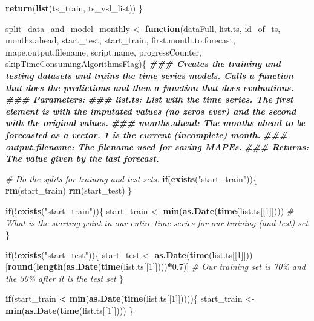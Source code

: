 \documentclass[
]{article}
\newenvironment{Shaded}{\begin{snugshade}}{\end{snugshade}}
\newcommand{\CommentTok}[1]{\textcolor[rgb]{0.56,0.35,0.01}{\textit{#1}}}
\newcommand{\ControlFlowTok}[1]{\textcolor[rgb]{0.13,0.29,0.53}{\textbf{#1}}}
\newcommand{\DecValTok}[1]{\textcolor[rgb]{0.00,0.00,0.81}{#1}}
\newcommand{\DocumentationTok}[1]{\textcolor[rgb]{0.56,0.35,0.01}{\textbf{\textit{#1}}}}
\newcommand{\FloatTok}[1]{\textcolor[rgb]{0.00,0.00,0.81}{#1}}
\newcommand{\FunctionTok}[1]{\textcolor[rgb]{0.13,0.29,0.53}{\textbf{#1}}}
\newcommand{\NormalTok}[1]{#1}
\newcommand{\OtherTok}[1]{\textcolor[rgb]{0.56,0.35,0.01}{#1}}
\newcommand{\SpecialCharTok}[1]{\textcolor[rgb]{0.81,0.36,0.00}{\textbf{#1}}}
\newcommand{\StringTok}[1]{\textcolor[rgb]{0.31,0.60,0.02}{#1}}
\begin{document}
\begin{Shaded}
\begin{Highlighting}[]
  \FunctionTok{return}\NormalTok{(}\FunctionTok{list}\NormalTok{(ts\_train, ts\_vsl\_list))}
\NormalTok{\}}


\NormalTok{split\_data\_and\_model\_monthly }\OtherTok{\textless{}{-}} \ControlFlowTok{function}\NormalTok{(dataFull, list.ts, id\_of\_ts, months.ahead, start\_test, start\_train, first.month.to.forecast, mape.output.filename, script.name, progressCounter, skipTimeConsumingAlgorithmsFlag)\{}
\DocumentationTok{\#\#\# Creates the training and testing datasets and trains the time series models. Calls a function that does the predictions and then a function that does evaluations.}
\DocumentationTok{\#\#\# Parameters:}
\DocumentationTok{\#\#\# list.ts: List with the time series. The first element is with the imputated values (no zeros ever) and the second with the original values.}
\DocumentationTok{\#\#\# months.ahead: The months ahead to be forecasted as a vector. 1 is the current (incomplete) month.}
\DocumentationTok{\#\#\# output.filename: The filename used for saving MAPEs.}
\DocumentationTok{\#\#\# Returns: The value given by the last forecast.}

  \CommentTok{\# Do the splits for training and test sets.}
  \ControlFlowTok{if}\NormalTok{(}\FunctionTok{exists}\NormalTok{(}\StringTok{"start\_train"}\NormalTok{))\{}
    \FunctionTok{rm}\NormalTok{(start\_train)}
    \FunctionTok{rm}\NormalTok{(start\_test)}
\NormalTok{  \}}

  \ControlFlowTok{if}\NormalTok{(}\SpecialCharTok{!}\FunctionTok{exists}\NormalTok{(}\StringTok{"start\_train"}\NormalTok{))\{}
\NormalTok{    start\_train }\OtherTok{\textless{}{-}} \FunctionTok{min}\NormalTok{(}\FunctionTok{as.Date}\NormalTok{(}\FunctionTok{time}\NormalTok{(list.ts[[}\DecValTok{1}\NormalTok{]]))) }\CommentTok{\# What is the starting point in our entire time series for our training (and test) set}
\NormalTok{  \}}

  \ControlFlowTok{if}\NormalTok{(}\SpecialCharTok{!}\FunctionTok{exists}\NormalTok{(}\StringTok{"start\_test"}\NormalTok{))\{}
\NormalTok{    start\_test }\OtherTok{\textless{}{-}} \FunctionTok{as.Date}\NormalTok{(}\FunctionTok{time}\NormalTok{(list.ts[[}\DecValTok{1}\NormalTok{]]))[}\FunctionTok{round}\NormalTok{(}\FunctionTok{length}\NormalTok{(}\FunctionTok{as.Date}\NormalTok{(}\FunctionTok{time}\NormalTok{(list.ts[[}\DecValTok{1}\NormalTok{]])))}\SpecialCharTok{*}\FloatTok{0.7}\NormalTok{)] }\CommentTok{\# Our training set is 70\% and the 30\% after it is the test set}
\NormalTok{  \}}
  
  \ControlFlowTok{if}\NormalTok{(start\_train }\SpecialCharTok{\textless{}} \FunctionTok{min}\NormalTok{(}\FunctionTok{as.Date}\NormalTok{(}\FunctionTok{time}\NormalTok{(list.ts[[}\DecValTok{1}\NormalTok{]]))))\{}
\NormalTok{    start\_train }\OtherTok{\textless{}{-}} \FunctionTok{min}\NormalTok{(}\FunctionTok{as.Date}\NormalTok{(}\FunctionTok{time}\NormalTok{(list.ts[[}\DecValTok{1}\NormalTok{]])))}
\NormalTok{  \}}
  

\end{Highlighting}
\end{Shaded}
\end{document}
